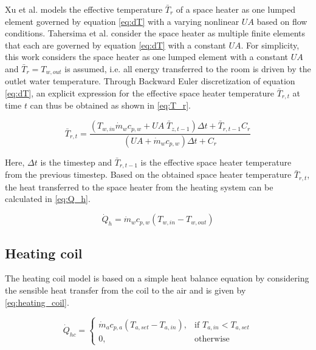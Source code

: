 Xu et al. \cite{XU20081755} models the effective temperature $\bar{T}_{r}$ of a space heater as one lumped element governed by equation \ref{eq:dT} with a varying nonlinear $U\!A$ based on flow conditions. Tahersima et al. \cite{Tahersima2010ThermalAO} consider the space heater as multiple finite elements that each are governed by equation \ref{eq:dT} with a constant $U\!A$. For simplicity, this work considers the space heater as one lumped element with a constant $U\!A$ and $\bar{T}_{r}=T_{w,out}$ is assumed, i.e. all energy transferred to the room is driven by the outlet water temperature. Through Backward Euler discretization  \cite{ODE_numerical_analysis} of equation \ref{eq:dT}, an explicit expression for the effective space heater temperature $\bar{T}_{r,t}$ at time $t$ can thus be obtained as shown in \autoref{eq:T_r}.

\begin{equation}
    \bar{T}_{r,t} =  \frac{\left(T_{w,in} \dot{m}_w c_{p,w} + U\!A \; \bar{T}_{z,t-1} \right)\Delta t + \bar{T}_{r,t-1}C_r}{\left(U\!A + \dot{m}_w c_{p,w}\right)\Delta t + C_r}
    \label{eq:T_r}
\end{equation}

Here, $\Delta t$ is the timestep and $\bar{T}_{r,t-1}$ is the effective space heater temperature from the previous timestep. Based on the obtained space heater temperature $\bar{T}_{r,t}$, the heat transferred to the space heater from the heating system can be calculated in \autoref{eq:Q_h}. 


\begin{equation}
    \dot{Q}_h = \dot{m}_w c_{p,w} (T_{w,in}-T_{w,out})
    \label{eq:Q_h}
\end{equation}



\subsection{Heating coil}
The heating coil model is based on a simple heat balance equation by considering the sensible heat transfer from the coil to the air and is given by \autoref{eq:heating_coil}. 

\begin{equation}
    \dot{Q}_{hc} = \begin{cases}
        \dot{m}_a c_{p,a} (T_{a,set}-T_{a,in}),& \text{if } T_{a,in}<T_{a,set}\\
        0,              & \text{otherwise}
    \end{cases}
    \label{eq:heating_coil}
\end{equation}

